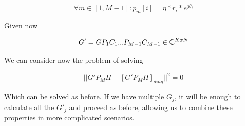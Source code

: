 \begin{equation}
  \forall m \in [1, M-1] : p_m[i] = \eta * r_i * e^{j\theta_i}
\end{equation}

Given now

\begin{equation}
  G' = GP_1C_1...P_{M-1}C_{M-1} \in \mathbb{C}^{KxN}
\end{equation}

We can consider now the problem of solving

\begin{equation}
  || G'P_MH - [G'P_MH]_{diag} || ^2 = 0
\end{equation}

Which can be solved as before. If we have multiple $G_j$, it will be enough to calculate all the $G'_j$ and proceed as before, allowing us to combine these properties in more complicated scenarios.
